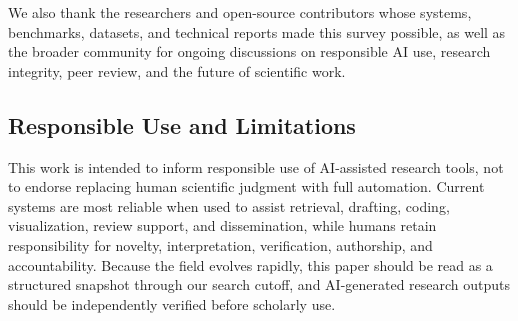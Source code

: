We also thank the researchers and open-source contributors whose systems, benchmarks, datasets, and technical reports made this survey possible, as well as the broader community for ongoing discussions on responsible AI use, research integrity, peer review, and the future of scientific work.


\subsection*{Responsible Use and Limitations}
This work is intended to inform responsible use of AI-assisted research tools, not to endorse replacing human scientific judgment with full automation. Current systems are most reliable when used to assist retrieval, drafting, coding, visualization, review support, and dissemination, while humans retain responsibility for novelty, interpretation, verification, authorship, and accountability. Because the field evolves rapidly, this paper should be read as a structured snapshot through our search cutoff, and AI-generated research outputs should be independently verified before scholarly use.